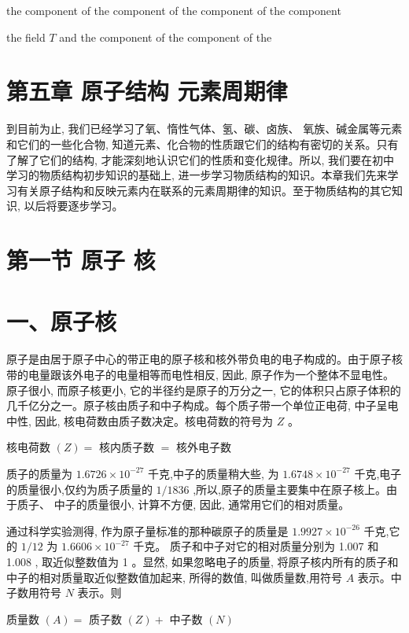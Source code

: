 \documentclass[10pt]{article}
\begin{document}
the component of the component of the component of the component

the field \(T\) and the component of the component of the

\section*{第五章 原子结构 元素周期律}

到目前为止, 我们已经学习了氧、惰性气体、氢、碳、卤族、 氧族、碱金属等元素和它们的一些化合物, 知道元素、化合物的性质跟它们的结构有密切的关系。只有了解了它们的结构, 才能深刻地认识它们的性质和变化规律。所以, 我们要在初中学习的物质结构初步知识的基础上, 进一步学习物质结构的知识。本章我们先来学习有关原子结构和反映元素内在联系的元素周期律的知识。至于物质结构的其它知识, 以后将要逐步学习。

\section*{第一节 原子 核}

\section*{一、原子核}

原子是由居于原子中心的带正电的原子核和核外带负电的电子构成的。由于原子核带的电量跟该外电子的电量相等而电性相反, 因此, 原子作为一个整体不显电性。原子很小, 而原子核更小, 它的半径约是原子的万分之一, 它的体积只占原子体积的几千亿分之一。原子核由质子和中子构成。每个质子带一个单位正电荷, 中子呈电中性, 因此, 核电荷数由质子数决定。核电荷数的符号为 \(Z\) 。

核电荷数 \(\left( Z\right) =\) 核内质子数 \(=\) 核外电子数

质子的质量为 \({1.6726} \times {10}^{-{27}}\) 千克,中子的质量稍大些, 为 \({1.6748} \times {10}^{-{27}}\) 千克,电子的质量很小,仅约为质子质量的 \(1/{1836}\) ,所以,原子的质量主要集中在原子核上。由于质子、 中子的质量很小, 计算不方便, 因此, 通常用它们的相对质量。

通过科学实验测得, 作为原子量标准的那种碳原子的质量是 \({1.9927} \times {10}^{-{26}}\) 千克,它的 \(1/{12}\) 为 \({1.6606} \times {10}^{-{27}}\) 千克。 质子和中子对它的相对质量分别为 1.007 和 1.008 , 取近似整数值为 1 。显然, 如果忽略电子的质量, 将原子核内所有的质子和中子的相对质量取近似整数值加起来, 所得的数值, 叫做质量数,用符号 \(A\) 表示。中子数用符号 \(N\) 表示。则

质量数 \(\left( A\right) =\) 质子数 \(\left( Z\right) +\) 中子数 \(\left( N\right)\)
\end{document}
